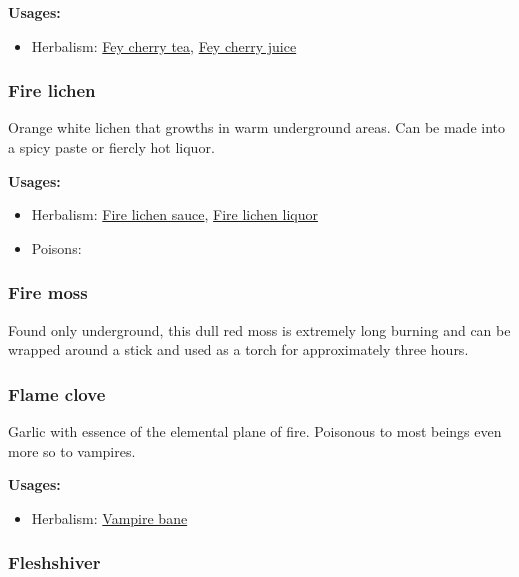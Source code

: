\textbf{Usages:}

\begin{itemize}[noitemsep]
\item[] Herbalism: \hyperref[Fey cherry tea]{Fey cherry tea}, \hyperref[Fey cherry juice]{Fey cherry juice}
\end{itemize}

\subsubsection{Fire lichen}
\label{Fire lichen}

Orange white lichen that growths in warm underground areas. Can be made into a spicy paste or fiercly hot liquor.

\vspace{5mm}

\textbf{Usages:}

\begin{itemize}[noitemsep]
\item[] Herbalism: \hyperref[Fire lichen sauce]{Fire lichen sauce}, \hyperref[Fire lichen liquor]{Fire lichen liquor}
\item[] Poisons: \poison
\end{itemize}

\subsubsection{Fire moss}
\label{fire_moss}

Found only underground, this dull red moss is extremely long burning and can be wrapped around a stick and used as a torch for approximately three hours.

\subsubsection{Flame clove}
\label{Flame clove}

Garlic with essence of the elemental plane of fire. Poisonous to most beings even more so to vampires.

\vspace{5mm}

\textbf{Usages:}

\begin{itemize}[noitemsep]
\item[] Herbalism: \hyperref[Vampire bane]{Vampire bane}
\end{itemize}

\subsubsection{Fleshshiver}
\label{Fleshshiver}

